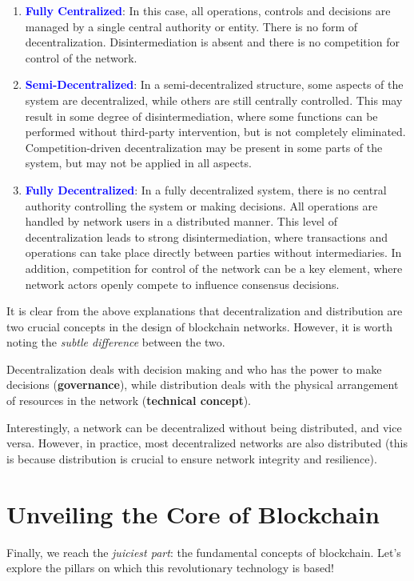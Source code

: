 \begin{enumerate}
\item \textbf{\textcolor{Blue}{Fully Centralized}}: In this case, all operations, controls and decisions are managed by a single central authority or entity. There is no form of decentralization. Disintermediation is absent and there is no competition for control of the network.

\item \textbf{\textcolor{Blue}{Semi-Decentralized}}: In a semi-decentralized structure, some aspects of the system are decentralized, while others are still centrally controlled. This may result in some degree of disintermediation, where some functions can be performed without third-party intervention, but is not completely eliminated. Competition-driven decentralization may be present in some parts of the system, but may not be applied in all aspects.

\item \textbf{\textcolor{Blue}{Fully Decentralized}}: In a fully decentralized system, there is no central authority controlling the system or making decisions. All operations are handled by network users in a distributed manner. This level of decentralization leads to strong disintermediation, where transactions and operations can take place directly between parties without intermediaries. In addition, competition for control of the network can be a key element, where network actors openly compete to influence consensus decisions.
\end{enumerate}

It is clear from the above explanations that decentralization and distribution are two crucial concepts in the design of blockchain networks. However, it is worth noting the \textit{subtle difference} between the two.

Decentralization deals with decision making and who has the power to make decisions (\textbf{governance}), while distribution deals with the physical arrangement of resources in the network (\textbf{technical concept}).

Interestingly, a network can be decentralized without being distributed, and vice versa. However, in practice, most decentralized networks are also distributed (this is because distribution is crucial to ensure network integrity and resilience).

\section{Unveiling the Core of Blockchain}
Finally, we reach the \textit{juiciest part}: the fundamental concepts of blockchain. Let's explore the pillars on which this revolutionary technology is based!

